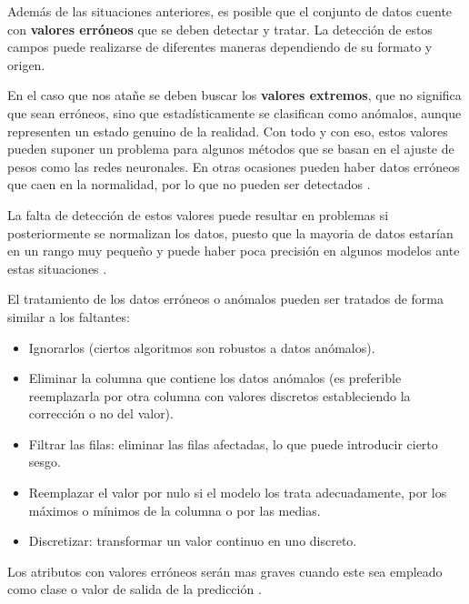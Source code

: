 Además de las situaciones anteriores, es posible que el conjunto de datos cuente con \textbf{valores erróneos} que 
se deben detectar y tratar.
La detección de estos campos puede realizarse de diferentes maneras dependiendo de su formato y origen.

En el caso que nos atañe se deben buscar los \textbf{valores extremos}, que no significa que sean erróneos, sino que 
estadísticamente se clasifican como anómalos, aunque representen un estado genuino de la realidad.
Con todo y con eso, estos valores pueden suponer un problema para algunos métodos que se basan en el ajuste de pesos
como las redes neuronales.
En otras ocasiones pueden haber datos erróneos que caen en la normalidad, por lo que no pueden ser detectados \cite{book:hernandez2004}.

La falta de detección de estos valores puede resultar en problemas si posteriormente se normalizan los datos, puesto
que la mayoria de datos estarían en un rango muy pequeño y puede haber poca precisión en algunos modelos ante estas situaciones \cite{book:hernandez2004}.

El tratamiento de los datos erróneos o anómalos pueden ser tratados de forma similar a los faltantes:
\begin{itemize}
    \item Ignorarlos (ciertos algoritmos son robustos a datos anómalos).
    \item Eliminar la columna que contiene los datos anómalos (es preferible reemplazarla por otra columna con valores discretos
        estableciendo la corrección o no del valor).
    \item Filtrar las filas: eliminar las filas afectadas, lo que puede introducir cierto sesgo.
    \item Reemplazar el valor por nulo si el modelo los trata adecuadamente, por los máximos o mínimos de la columna o por
        las medias.
    \item Discretizar: transformar un valor continuo en uno discreto.
\end{itemize}
Los atributos con valores erróneos serán mas graves cuando este sea empleado como clase o valor de salida de la predicción \cite{book:hernandez2004}. 